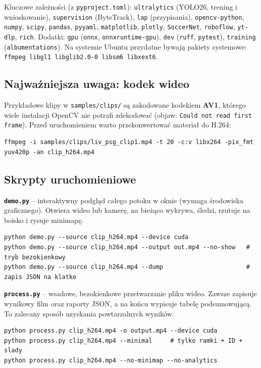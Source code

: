 \documentclass[11pt,a4paper]{article}
\begin{document}
Kluczowe zależności (z \texttt{pyproject.toml}): \texttt{ultralytics} (YOLO26,
trening i wnioskowanie), \texttt{supervision} (ByteTrack), \texttt{lap}
(przypisania), \texttt{opencv-python}, \texttt{numpy}, \texttt{scipy},
\texttt{pandas}, \texttt{pyyaml}, \texttt{matplotlib}, \texttt{plotly},
\texttt{SoccerNet}, \texttt{roboflow}, \texttt{yt-dlp}, \texttt{rich}. Dodatki:
\texttt{gpu} (\texttt{onnx}, \texttt{onnxruntime-gpu}), \texttt{dev}
(\texttt{ruff}, \texttt{pytest}), \texttt{training} (\texttt{albumentations}).
Na systemie Ubuntu przydatne bywają pakiety systemowe:
\texttt{ffmpeg libgl1 libglib2.0-0 libsm6 libxext6}.

\subsection{Najważniejsza uwaga: kodek wideo}

Przykładowe klipy w \texttt{samples/clips/} są zakodowane kodekiem \textbf{AV1},
którego wiele instalacji OpenCV nie potrafi zdekodować (objaw: \texttt{Could not
read first frame}). Przed uruchomieniem warto przekonwertować materiał do
H.264:

\begin{lstlisting}[style=sh]
ffmpeg -i samples/clips/liv_psg_clip1.mp4 -t 20 -c:v libx264 -pix_fmt yuv420p -an clip_h264.mp4
\end{lstlisting}

\subsection{Skrypty uruchomieniowe}

\textbf{\texttt{demo.py}} -- interaktywny podgląd całego potoku w oknie (wymaga
środowiska graficznego). Otwiera wideo lub kamerę, na bieżąco wykrywa, śledzi,
rzutuje na boisko i rysuje minimapę.
\begin{lstlisting}[style=sh]
python demo.py --source clip_h264.mp4 --device cuda
python demo.py --source clip_h264.mp4 --output out.mp4 --no-show   # tryb bezokienkowy
python demo.py --source clip_h264.mp4 --dump                       # zapis JSON na klatke
\end{lstlisting}

\textbf{\texttt{process.py}} -- wsadowe, bezokienkowe przetwarzanie pliku wideo.
Zawsze zapisuje wynikowy film oraz raporty JSON, a na końcu wypisuje tabelę
podsumowującą. To zalecany sposób uzyskania powtarzalnych wyników.
\begin{lstlisting}[style=sh]
python process.py clip_h264.mp4 -o output.mp4 --device cuda
python process.py clip_h264.mp4 --minimal     # tylko ramki + ID + slady
python process.py clip_h264.mp4 --no-minimap --no-analytics
\end{lstlisting}
\end{document}
